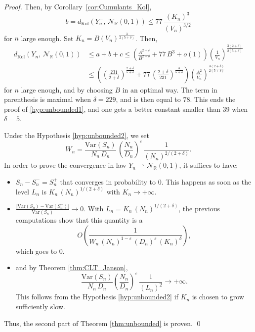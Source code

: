 \documentclass[envcountsame]{svmult}
\newcommand{\R}{\mathbb{R}}
\newcommand{\dkol}{d_\mathrm{Kol}}
\newcommand{\eps}{\varepsilon}
\newcommand{\var}{\mathrm{Var}}
\newcommand{\gauss}{\mathcal{N}_{\R}(0,1)}
\begin{document}
\begin{proof}
Then, by Corollary~\ref{cor:Cumulants_Kol},
$$b=\dkol(Y_n^-,\,\gauss) \leq 77\, \frac{(K_n)^3}{(V_n)^{3/2}}$$
for $n$ large enough. Set $K_n = B(V_n)^{\frac{3}{2(5+\delta)}}$. Then,
\begin{align*}
\dkol(Y_n,\,\gauss)&\leq a+b+c \leq \left(\frac{A^{2+\delta}}{B^{2+\delta}}+77\,B^3+o(1)\right) \left(\frac{1}{V_n}\right)^{\frac{3(2+\delta)}{2(5+\delta)}} \\
&\leq \left(\left(\frac{231}{2+\delta}\right)^{\frac{2+\delta}{5+\delta}} + 77\,\left(\frac{2+\delta}{231}\right)^{\frac{3}{5+\delta}}\right) \left(\frac{A^2}{V_n}\right)^{\frac{3(2+\delta)}{2(5+\delta)}}
\end{align*}
for $n$ large enough, and by choosing $B$ in an optimal way. The term in parenthesis is maximal when $\delta=229$, and is then equal to $78$. This ends the proof of \ref{hyp:unbounded1}, and one gets a better constant smaller than $39$ when $\delta=5$.
\bigskip

Under the Hypothesis \ref{hyp:unbounded2}, we set $$W_n= \frac{\var(S_n)}{N_n\, D_n}\,\left(\frac{N_n}{D_n}\right)^{\!\eps} \,\frac{1}{(N_n)^{2/(2+\delta)}}.$$
In order to prove the convergence in law $Y_n \rightharpoonup \gauss$, it suffices to have:
\begin{itemize}
	\item $S_n-S_n^- = S_n^+$ that converges in probability to $0$. This happens as soon as the level $L_n$ is $K_n\, (N_n)^{1/(2+\delta)}$ with $K_n \to +\infty$.
	\item $\frac{|\var(S_n)-\var(S_n^-)|}{\var(S_n)} \to 0$. With $L_n = K_n\,(N_n)^{1/(2+\delta)}$, the previous computations show that this quantity is a 
	$$O\left(\frac{1}{W_n\,(N_n)^{1 -\eps}\,(D_n)^{\eps}\,(K_n)^{\delta}}\right),$$
	which goes to $0$.
	\item and by Theorem \ref{thm:CLT_Janson}, 
	$$\frac{\var(S_n)}{N_n\,D_n}\left(\frac{N_n}{D_n}\right)^\eps\,\frac{1}{(L_n)^2} \to +\infty .$$
	This follows from the Hypothesis \ref{hyp:unbounded2} if $K_n$ is chosen to grow sufficiently slow. 
\end{itemize}
Thus, the second part of Theorem \ref{thm:unbounded} is proven.
\qed
\end{proof}
\end{document}
